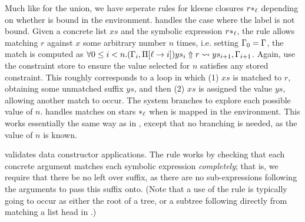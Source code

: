 Much like for the union,
we have seperate rules for kleene closures $r*_\ell$
depending on whether \lab is bound in the environment.
\ValidateStarSolve handles the case where
the label is not bound.
Given a concrete list $xs$
and the symbolic expression $r*_\ell$,
the rule
allows matching $r$ against $x$
some arbitrary number $n$ times,
i.e. setting $\Gamma_0 = \Gamma$,
the match is computed as
$\forall 0 \leq i < n . (\Gamma_{i}, \Pi [\ell \rightarrow i]) ys_i \Uparrow r \leadsto ys_{i + 1}, \Gamma_{i + 1}$.
Again, \ValidateStarSolve use the constraint store to ensure the value selected for $n$ satisfies any stored constraint.
This roughly corresponds to a loop in which
(1) $xs$ is matched to $r$, obtaining some unmatched suffix $ys$,
and then (2) $xs$ is assigned the value $ys$, allowing another match to occur.
The system branches to explore each possible value of
$n$.
\ValidateStar handles matches on stars $*_\ell$ when \lab is mapped in the environment.
This works essentially the same way as in \ValidateStarSolve,
except that no branching is needed, as the value of $n$ is known.

\ValidateApplication
validates data constructor applications.
The rule works by checking that each
concrete argument matches each symbolic expression \textit{completely};
that is, we require that there be no left over suffix,
as there are no sub-expressions following the arguments to pass this suffix onto.
(Note that a use of the \ValidateApplication rule is typically
going to occur as either the root of a tree,
or a subtree following directly from matching a list head in \ValidateCons.)





